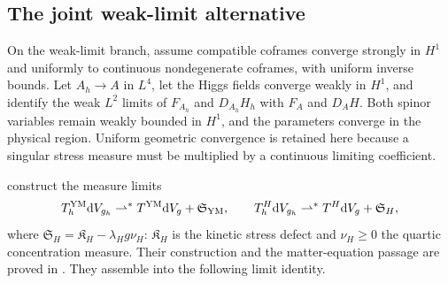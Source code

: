 \documentclass[11pt]{article}
\numberwithin{equation}{section}
\theoremstyle{definition}
\theoremstyle{remark}
\newcommand{\dd}{\mathrm d}
\newcommand{\dV}{\dd V}
\begin{document}
\subsection{The joint weak-limit alternative}

On the weak-limit branch, assume compatible coframes converge strongly
in $H^1$ and uniformly to continuous nondegenerate coframes, with uniform
inverse bounds. Let $A_h\to A$ in $L^4$, let the Higgs fields converge weakly
in $H^1$, and identify the weak $L^2$ limits of $F_{A_h}$ and $D_{A_h}H_h$
with $F_A$ and $D_AH$. Both spinor variables remain weakly bounded in
$H^1$, and the parameters converge in the physical region. Uniform
geometric convergence is retained here because a singular stress measure
must be multiplied by a continuous limiting coefficient.

 construct the measure limits
\[
 T_h^{\rm YM}\dV_{g_h}\rightharpoonup^*
       T^{\rm YM}\dV_g+\mathfrak S_{\rm YM},\qquad
 T_h^H\dV_{g_h}\rightharpoonup^*
       T^H\dV_g+\mathfrak S_H,
\]
where $\mathfrak S_H=\mathfrak K_H-\lambda_Hg\nu_H$:
$\mathfrak K_H$ is the kinetic stress defect and $\nu_H\ge0$ the quartic
concentration measure. Their construction and the matter-equation passage
are proved in . They assemble into the
following limit identity.
\end{document}
